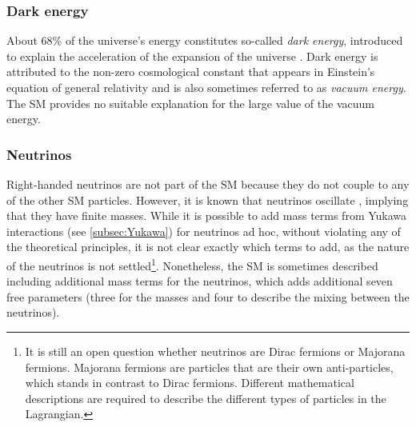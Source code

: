 
\subsubsection{Dark energy}
About 68\% of the universe's energy constitutes so-called \emph{dark energy}, introduced to explain the acceleration of the expansion of the universe \cite{Riess_1998,Perlmutter_1999}. Dark energy is attributed to the non-zero cosmological constant that appears in Einstein's equation of general relativity and is also sometimes referred to as \emph{vacuum energy}. The SM provides no suitable explanation for the large value of the vacuum energy.


\subsubsection{Neutrinos}
Right-handed neutrinos are not part of the SM because they do not couple to any of the other SM particles.
However, it is known that neutrinos oscillate \cite{Gonzalez_Garcia_2008}, implying that they have finite masses.
While it is possible to add mass terms from Yukawa interactions (see \cref{subsec:Yukawa}) for neutrinos ad hoc, without violating any of the theoretical principles, it is not clear exactly which terms to add, as the nature of the neutrinos is not settled\footnote{It is still an open question whether neutrinos are Dirac fermions or Majorana fermions. Majorana fermions are particles that are their own anti-particles, which stands in contrast to Dirac fermions. Different mathematical descriptions are required to describe the different types of particles in the Lagrangian.}. 
Nonetheless, the SM is sometimes described including additional mass terms for the neutrinos, which adds additional seven free parameters (three for the masses and four to describe the mixing between the neutrinos).

